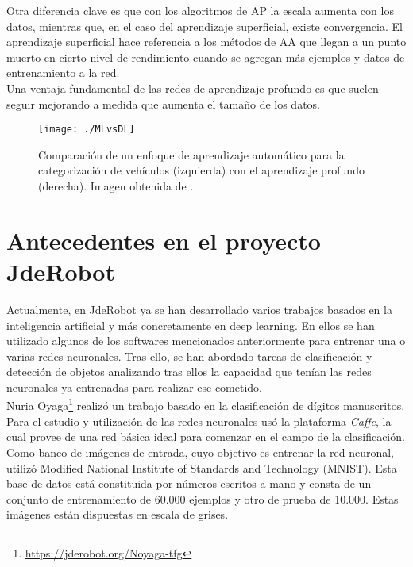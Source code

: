 \documentclass[a4paper, 12pt, oneside]{book}
\begin{document}
Otra diferencia clave es que con los algoritmos de AP la escala aumenta con los datos, mientras que, en el caso del aprendizaje superficial, existe convergencia. El aprendizaje superficial hace referencia a los métodos de AA que llegan a un punto muerto en cierto nivel de rendimiento cuando se agregan más ejemplos y datos de entrenamiento a la red.\\

Una ventaja fundamental de las redes de aprendizaje profundo es que suelen seguir mejorando a medida que aumenta el tamaño de los datos.\\

\begin{figure}[H]
\begin{center}
\texttt{[image: ./MLvsDL]}
\caption{Comparación de un enfoque de aprendizaje automático para la categorización de vehículos (izquierda) con el aprendizaje profundo (derecha). Imagen obtenida de \cite{SSD_3}.}
\label{MArcoIA}
\end{center}
\end{figure}


\section{Antecedentes en el proyecto JdeRobot}

Actualmente, en JdeRobot ya se han desarrollado varios trabajos basados en la inteligencia artificial y más concretamente en deep learning. En ellos se han utilizado algunos de los softwares mencionados anteriormente para entrenar una o varias redes neuronales. Tras ello, se han abordado tareas de clasificación y detección de objetos analizando tras ellos la capacidad que tenían las redes neuronales ya entrenadas para realizar ese cometido.\\

Nuria Oyaga\footnote{\url{https://jderobot.org/Noyaga-tfg}} realizó un trabajo basado en la clasificación de dígitos manuscritos. Para el estudio y utilización de las redes neuronales usó la plataforma \textit{Caffe}, la cual provee de una red básica ideal para  comenzar en el campo de la clasificación.\\

Como banco de imágenes de entrada, cuyo objetivo es entrenar la red neuronal, utilizó  Modified National Institute of Standards and Technology (MNIST). Esta base de datos está constituida por números escritos a mano y consta de un conjunto de entrenamiento de 60.000 ejemplos y otro de prueba de 10.000. Estas imágenes están dispuestas en escala de grises.\\
\end{document}
